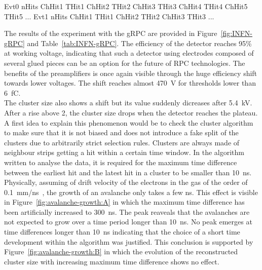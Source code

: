     \begin{code}
    \vspace{5mm}
    \begin{textcode}
Evt0	nHits
ChHit1	THit1
ChHit2	THit2
ChHit3	THit3
ChHit4	THit4
ChHit5	THit5
...
Evt1	nHits
ChHit1	THit1
ChHit2	THit2
ChHit3	THit3
...
    \end{textcode}
	\label{text:data}
	\vspace{5mm}
    \end{code}
    
    The results of the experiment with the gRPC are provided in Figure~\ref{fig:INFN-gRPC} and Table~\ref{tab:INFN-gRPC}. The efficiency of the detector reaches 95\% at working voltage, indicating that such a detector using electrodes composed of several glued pieces can be an option for the future of RPC technologies. The benefits of the preamplifiers is once again visible through the huge efficiency shift towards lower voltages. The shift reaches almost \SI{470}{V} for thresholds lower than \SI{6}{fC}.\\
    The cluster size also shows a shift but its value suddenly dicreases after \SI{5.4}{kV}. After a rise above 2, the cluster size drops when the detector reaches the plateau. A first idea to explain this phenomenon would be to check the cluster algorithm to make sure that it is not biased and does not introduce a fake split of the clusters due to arbitrarily strict selection rules. Clusters are always made of neighbour strips getting a hit within a certain time window. In the algorithm written to analyse the data, it is required for the maximum time difference between the earliest hit and the latest hit in a cluster to be smaller than \SI{10}{ns}. Physically, assuming of drift velocity of the electrons in the gas of the order of \SI{0.1}{mm/ns}~\cite{DEURQUIJO2009}, the growth of an avalanche only takes a few \si{ns}. This effect is visible in Figure~\ref{fig:avalanche-growth:A} in which the maximum time difference has been artificially increased to \SI{300}{ns}. The peak reaveals that the avalanches are not expected to grow over a time period longer than \SI{10}{ns}. No peak emerges at time differences longer than \SI{10}{ns} indicating that the choice of a short time development within the algorithm was justified. This conclusion is supported by Figure~\ref{fig:avalanche-growth:B} in which the evolution of the reconstructed cluster size with increasing maximum time difference shows no effect.
    
